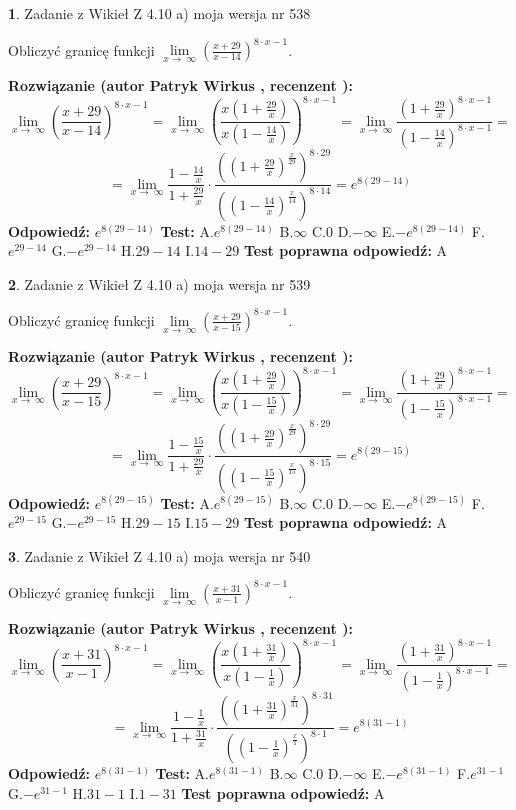 \documentclass[12pt, a4paper]{article}
\theoremstyle{definition} %
\newtheorem{zad}{}
\newcommand{\zadStart}[1]{\begin{zad}#1\newline}
\newcommand{\zadStop}{\end{zad}}
\newcommand{\rozwStart}[2]{\noindent \textbf{Rozwiązanie (autor #1 , recenzent #2): }\newline}
\newcommand{\rozwStop}{\newline}
\newcommand{\odpStart}{\noindent \textbf{Odpowiedź:}\newline}
\newcommand{\odpStop}{\newline}
\newcommand{\testStart}{\noindent \textbf{Test:}\newline}
\newcommand{\testStop}{\newline}
\newcommand{\kluczStart}{\noindent \textbf{Test poprawna odpowiedź:}\newline}
\newcommand{\kluczStop}{\newline}
\begin{document}
\zadStart{Zadanie z Wikieł Z 4.10 a) moja wersja nr 538}


Obliczyć granicę funkcji  $\lim\limits_{x\to\ \infty}(\frac{x+29}{x-14})^{8\cdot x-1}$.
\zadStop
\rozwStart{Patryk Wirkus}{}
$$\lim\limits_{x\to\ \infty}(\frac{x+29}{x-14})^{8\cdot x-1} = \lim\limits_{x\to\ \infty}(\frac{x(1+\frac{29}{x})}{x(1-\frac{14}{x})})^{8\cdot x-1}=\lim\limits_{x\to\ \infty}\frac{(1+\frac{29}{x})^{8\cdot x-1}}{(1-\frac{14}{x})^{8\cdot x-1}}=$$
$$=\lim\limits_{x\to\ \infty}\frac{1-\frac{14}{x}}{1+\frac{29}{x}}\cdot\frac{((1+\frac{29}{x})^{\frac{x}{29}})^{8\cdot29}}{((1-\frac{14}{x})^{\frac{x}{14}})^{8\cdot14}}=e^{8(29-14)}$$
\rozwStop
\odpStart
$e^{8(29-14)}$
\odpStop
\testStart
A.$e^{8(29-14)}$ B.$\infty$ C.$0$ D.$-\infty$ E.$-e^{8(29-14)}$
F.$e^{29-14}$ G.$-e^{29-14}$
H.$29-14$
I.$14-29$
\testStop
\kluczStart
A
\kluczStop



\zadStart{Zadanie z Wikieł Z 4.10 a) moja wersja nr 539}


Obliczyć granicę funkcji  $\lim\limits_{x\to\ \infty}(\frac{x+29}{x-15})^{8\cdot x-1}$.
\zadStop
\rozwStart{Patryk Wirkus}{}
$$\lim\limits_{x\to\ \infty}(\frac{x+29}{x-15})^{8\cdot x-1} = \lim\limits_{x\to\ \infty}(\frac{x(1+\frac{29}{x})}{x(1-\frac{15}{x})})^{8\cdot x-1}=\lim\limits_{x\to\ \infty}\frac{(1+\frac{29}{x})^{8\cdot x-1}}{(1-\frac{15}{x})^{8\cdot x-1}}=$$
$$=\lim\limits_{x\to\ \infty}\frac{1-\frac{15}{x}}{1+\frac{29}{x}}\cdot\frac{((1+\frac{29}{x})^{\frac{x}{29}})^{8\cdot29}}{((1-\frac{15}{x})^{\frac{x}{15}})^{8\cdot15}}=e^{8(29-15)}$$
\rozwStop
\odpStart
$e^{8(29-15)}$
\odpStop
\testStart
A.$e^{8(29-15)}$ B.$\infty$ C.$0$ D.$-\infty$ E.$-e^{8(29-15)}$
F.$e^{29-15}$ G.$-e^{29-15}$
H.$29-15$
I.$15-29$
\testStop
\kluczStart
A
\kluczStop



\zadStart{Zadanie z Wikieł Z 4.10 a) moja wersja nr 540}


Obliczyć granicę funkcji  $\lim\limits_{x\to\ \infty}(\frac{x+31}{x-1})^{8\cdot x-1}$.
\zadStop
\rozwStart{Patryk Wirkus}{}
$$\lim\limits_{x\to\ \infty}(\frac{x+31}{x-1})^{8\cdot x-1} = \lim\limits_{x\to\ \infty}(\frac{x(1+\frac{31}{x})}{x(1-\frac{1}{x})})^{8\cdot x-1}=\lim\limits_{x\to\ \infty}\frac{(1+\frac{31}{x})^{8\cdot x-1}}{(1-\frac{1}{x})^{8\cdot x-1}}=$$
$$=\lim\limits_{x\to\ \infty}\frac{1-\frac{1}{x}}{1+\frac{31}{x}}\cdot\frac{((1+\frac{31}{x})^{\frac{x}{31}})^{8\cdot31}}{((1-\frac{1}{x})^{\frac{x}{1}})^{8\cdot1}}=e^{8(31-1)}$$
\rozwStop
\odpStart
$e^{8(31-1)}$
\odpStop
\testStart
A.$e^{8(31-1)}$ B.$\infty$ C.$0$ D.$-\infty$ E.$-e^{8(31-1)}$
F.$e^{31-1}$ G.$-e^{31-1}$
H.$31-1$
I.$1-31$
\testStop
\kluczStart
A
\kluczStop
\end{document}
